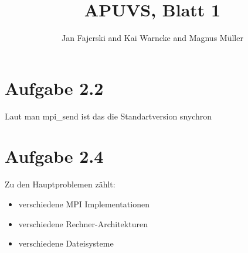 \documentclass[a4paper,
               12pt,
               BCOR12mm,
               ]{scrartcl}
\title{APUVS, Blatt 1}
\author{Jan Fajerski and Kai Warncke and Magnus Müller}
\begin{document}
\maketitle  
  \section*{Aufgabe 2.2}
    Laut man mpi\_send ist das die Standartversion snychron

  \section*{Aufgabe 2.4}
    Zu den Hauptproblemen zählt:
    \begin{itemize}
      \item verschiedene MPI Implementationen
      \item verschiedene Rechner-Architekturen
      \item verschiedene Dateisysteme
    \end{itemize}

		\nocite{*}
		
		
\end{document}
